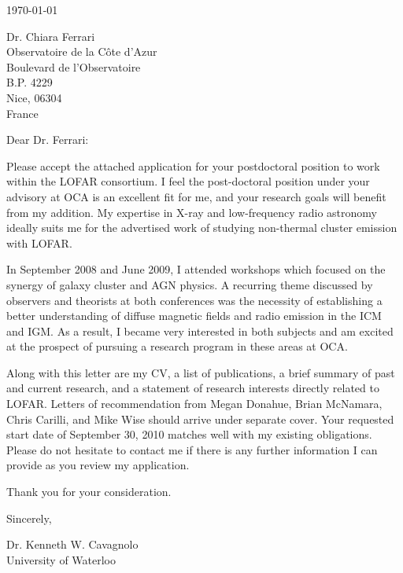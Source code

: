 \documentclass[11pt]{article}
\begin{document}
\today

Dr. Chiara Ferrari\\
Observatoire de la C\^ote d'Azur\\
Boulevard de l'Observatoire\\
B.P. 4229\\
Nice, 06304\\
France 

Dear Dr. Ferrari:

Please accept the attached application for your postdoctoral position
to work within the LOFAR consortium. I feel the post-doctoral position
under your advisory at OCA is an excellent fit for me, and your
research goals will benefit from my addition. My expertise in X-ray
and low-frequency radio astronomy ideally suits me for the advertised
work of studying non-thermal cluster emission with LOFAR.

In September 2008 and June 2009, I attended workshops which focused on
the synergy of galaxy cluster and AGN physics. A recurring theme
discussed by observers and theorists at both conferences was the
necessity of establishing a better understanding of diffuse magnetic
fields and radio emission in the ICM and IGM. As a result, I became
very interested in both subjects and am excited at the prospect of
pursuing a research program in these areas at OCA.

Along with this letter are my CV, a list of publications, a brief
summary of past and current research, and a statement of research
interests directly related to LOFAR. Letters of recommendation from
Megan Donahue, Brian McNamara, Chris Carilli, and Mike Wise should
arrive under separate cover. Your requested start date of September
30\ths, 2010 matches well with my existing obligations. Please do not
hesitate to contact me if there is any further information I can
provide as you review my application.

Thank you for your consideration.

Sincerely,\\
\begin{minipage}{7.5in}
\end{minipage}
Dr. Kenneth W. Cavagnolo\\
University of Waterloo
\end{document}
